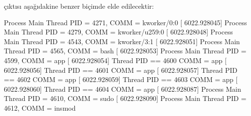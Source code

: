 \documentclass[a4paper,10pt,turkish]{sphinxmanual}
\begin{document}
\begin{sphinxVerbatim}[commandchars=\\\{\}]



\end{sphinxVerbatim}

\sphinxAtStartPar
{} çıktısı aşağıdakine benzer biçimde elde edilecektir:

\begin{sphinxVerbatim}[commandchars=\\\{\}]
[ 6022.928044] Process Main Thread PID = 4271, COMM = kworker/0:0
[ 6022.928045] Process Main Thread PID = 4279, COMM = kworker/u259:0
[ 6022.928048] Process Main Thread PID = 4543, COMM = kworker/3:1
[ 6022.928051] Process Main Thread PID = 4565, COMM = bash
[ 6022.928053] Process Main Thread PID = 4599, COMM = app
[ 6022.928054]     Thread PID == 4600 COMM = app
[ 6022.928056]     Thread PID == 4601 COMM = app
[ 6022.928057]     Thread PID == 4602 COMM = app
[ 6022.928059]     Thread PID == 4603 COMM = app
[ 6022.928060]     Thread PID == 4604 COMM = app
[ 6022.928087] Process Main Thread PID = 4610, COMM = sudo
[ 6022.928090] Process Main Thread PID = 4612, COMM = insmod
\end{sphinxVerbatim}
\end{document}
